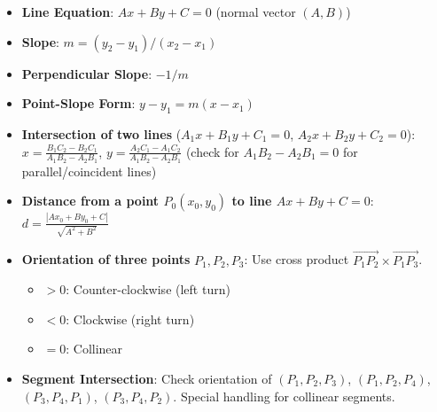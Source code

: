 \begin{itemize}
    \item \textbf{Line Equation}: $Ax + By + C = 0$ (normal vector $(A, B)$)
    \item \textbf{Slope}: $m = (y_2-y_1)/(x_2-x_1)$
    \item \textbf{Perpendicular Slope}: $-1/m$
    \item \textbf{Point-Slope Form}: $y - y_1 = m(x - x_1)$
    \item \textbf{Intersection of two lines} ($A_1x+B_1y+C_1=0$, $A_2x+B_2y+C_2=0$):
    $x = \frac{B_1C_2 - B_2C_1}{A_1B_2 - A_2B_1}$, $y = \frac{A_2C_1 - A_1C_2}{A_1B_2 - A_2B_1}$ (check for $A_1B_2 - A_2B_1 = 0$ for parallel/coincident lines)
    \item \textbf{Distance from a point $P_0(x_0, y_0)$ to line $Ax+By+C=0$}:
    $d = \frac{|Ax_0 + By_0 + C|}{\sqrt{A^2 + B^2}}$
    \item \textbf{Orientation of three points} $P_1, P_2, P_3$: Use cross product $\vec{P_1P_2} \times \vec{P_1P_3}$.
        \begin{itemize}
            \item $> 0$: Counter-clockwise (left turn)
            \item $< 0$: Clockwise (right turn)
            \item $= 0$: Collinear
        \end{itemize}
    \item \textbf{Segment Intersection}: Check orientation of $(P_1, P_2, P_3)$, $(P_1, P_2, P_4)$, $(P_3, P_4, P_1)$, $(P_3, P_4, P_2)$. Special handling for collinear segments.
\end{itemize}

